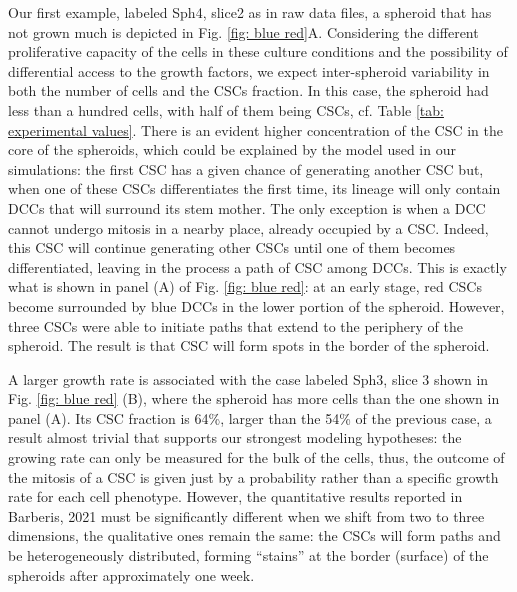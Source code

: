 \documentclass[fleqn,10pt]{wlscirep}
\begin{document}
Our first example, labeled {\textsf Sph4, slice2} as in raw data files, a spheroid that has not grown much is depicted in Fig. \ref{fig: blue red}A. Considering the different proliferative capacity of the cells in these culture conditions and the possibility of differential access to the growth factors, we expect inter-spheroid variability in both the number of cells and the CSCs fraction. In this case, the spheroid had less than a hundred cells, with half of them being CSCs, cf.  Table \ref{tab: experimental values}.  There is an evident higher concentration of the CSC in the core of the spheroids, which could be explained by the model used in our simulations: the first CSC has a given chance of generating another CSC but, when one of these CSCs differentiates the first time, its lineage will only contain DCCs that will surround its stem mother. The only exception is when a DCC cannot undergo mitosis in a nearby place, already occupied by a CSC. Indeed, this CSC will continue generating other CSCs until one of them becomes differentiated, leaving in the process a path of CSC among DCCs. This is exactly what is shown in panel (A) of Fig. \ref{fig: blue red}: at an early stage, red CSCs become surrounded by blue DCCs in the lower portion of the spheroid. However, three CSCs were able to initiate paths that extend to the periphery of the spheroid. The result is that CSC will form spots in the border of the spheroid.


A larger growth rate is associated with the case labeled {\textsf Sph3, slice 3} shown in Fig. \ref{fig: blue red} (B), where the spheroid has more cells than the one shown in panel (A). Its CSC fraction is 64\%, larger than the 54\% of the previous case, a result almost trivial that supports  our strongest modeling hypotheses: the growing rate can only be measured for the bulk of the cells, thus, the outcome of the mitosis of a CSC is given just by a probability rather than a specific growth rate for each cell phenotype\cite{benitez2021}.  However, the quantitative results reported in Barberis, 2021\cite{barberis2021percolation} must be significantly different when we shift from two to three dimensions, the qualitative ones remain the same: the CSCs will form paths and be heterogeneously distributed, forming ``stains'' at the border (surface) of the spheroids after approximately one week.  
\end{document}
